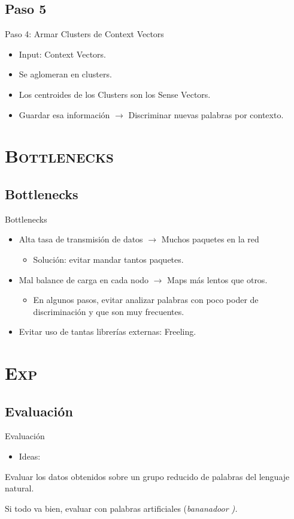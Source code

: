 \documentclass[xcolor=x11names,compress]{beamer}
\renewcommand{\(}{\begin{columns}}
\renewcommand{\)}{\end{columns}}
\newcommand{\<}[1]{\begin{column}{#1}}
\renewcommand{\>}{\end{column}}
\begin{document}
\subsection{Paso 5}
\begin{frame}{Paso 4: Armar Clusters de Context Vectors}
\begin{itemize}
\item Input: Context Vectors.
\item Se aglomeran en clusters.
\item Los centroides de los Clusters son los Sense Vectors.
\item Guardar esa información $\rightarrow$ Discriminar nuevas palabras por contexto.
\end{itemize}
\end{frame}


\section{\scshape Bottlenecks}
\subsection{Bottlenecks}
\begin{frame}{Bottlenecks}
\begin{itemize}
\item Alta tasa de transmisión de datos $\rightarrow$ Muchos paquetes en la red
\begin{itemize}
\item Solución: evitar mandar tantos paquetes.
\end{itemize}
\item Mal balance de carga en cada nodo $\rightarrow$ Maps más lentos que otros.
\begin{itemize}
\item En algunos pasos, evitar analizar palabras con poco poder de discriminación y que son muy frecuentes.
\end{itemize}
\item Evitar uso de tantas librerías externas: Freeling.
\end{itemize}
\end{frame}

\section{\scshape Exp}
\subsection{Evaluación}
\begin{frame}{Evaluación}
\begin{itemize}
\item Ideas:
\end{itemize}
\item Evaluar los datos obtenidos sobre un grupo reducido de palabras del lenguaje natural.
\item Si todo va bien, evaluar con palabras artificiales (\em bananadoor \em).
\end{frame}
\end{document}
